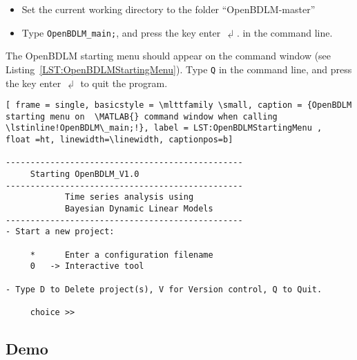 \begin{itemize}
\item Set the current working directory to the folder ``OpenBDLM-master''
\item Type \colorbox{light-gray}{\lstinline[basicstyle = \mlttfamily \small, backgroundcolor = \color{light-gray}]!OpenBDLM_main;!}, and press the key enter $\dlsh$.
in the \MATLAB{} command line.
\end{itemize}
The OpenBDLM starting menu should appear on the \MATLAB{} command window (see Listing~\ref{LST:OpenBDLMStartingMenu}).
Type \colorbox{light-gray}{\lstinline[basicstyle = \mlttfamily \small, backgroundcolor = \color{light-gray}]!Q!} in the command line, and press the key enter $\dlsh$ to quit the program.
\begin{lstlisting}[ frame = single, basicstyle = \mlttfamily \small, caption = {OpenBDLM starting menu on  \MATLAB{} command window when calling \lstinline!OpenBDLM\_main;!}, label = LST:OpenBDLMStartingMenu ,  float =ht, linewidth=\linewidth, captionpos=b]

------------------------------------------------
     Starting OpenBDLM_V1.0
------------------------------------------------
            Time series analysis using 
            Bayesian Dynamic Linear Models
------------------------------------------------
- Start a new project: 

     *      Enter a configuration filename 
     0   -> Interactive tool 

- Type D to Delete project(s), V for Version control, Q to Quit.

     choice >>
\end{lstlisting}


\subsection{Demo}

